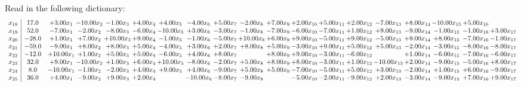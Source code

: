 \documentclass[9pt]{article}
\begin{document}
Read in the following dictionary:
\[\begin{array}{c| c c@{\hskip 2pt} c@{\hskip 2pt} c@{\hskip 2pt} c@{\hskip 2pt} c@{\hskip 2pt} c@{\hskip 2pt} c@{\hskip 2pt} c@{\hskip 2pt} c@{\hskip 2pt} c@{\hskip 2pt} c@{\hskip 2pt} c@{\hskip 2pt} c@{\hskip 2pt} c@{\hskip 2pt} c@{\hskip 2pt} c@{\hskip 2pt} c@{\hskip 2pt} }
 x_{18}   &  17.0 & +  3.00 x_{1} & -10.00 x_{2} & -1.00 x_{3} & +  4.00 x_{4} & +  4.00 x_{5} & -4.00 x_{6} & +  5.00 x_{7} & -2.00 x_{8} & +  7.00 x_{9} & +  2.00 x_{10} & +  5.00 x_{11} & +  2.00 x_{12} & -7.00 x_{13} & +  8.00 x_{14} & -10.00 x_{15} & +  5.00 x_{16} &   \\
 x_{19}   &  52.0 & -7.00 x_{1} & -2.00 x_{2} & -8.00 x_{3} & -6.00 x_{4} & -10.00 x_{5} & +  3.00 x_{6} & -3.00 x_{7} & -1.00 x_{8} & -7.00 x_{9} & -6.00 x_{10} & -7.00 x_{11} & +  1.00 x_{12} & +  9.00 x_{13} & -9.00 x_{14} & -1.00 x_{15} & -1.00 x_{16} & +  3.00 x_{17}\\
 x_{20}   &  -28.0 & +  1.00 x_{1} & +  7.00 x_{2} & + 10.00 x_{3} & +  9.00 x_{4} & -1.00 x_{5} & -1.00 x_{6} & -5.00 x_{7} & + 10.00 x_{8} & +  6.00 x_{9} & +  9.00 x_{10} & -5.00 x_{11} & +  9.00 x_{12} & -5.00 x_{13} & +  9.00 x_{14} & +  8.00 x_{15} & -7.00 x_{16} & -1.00 x_{17}\\
 x_{21}   &  -59.0 & -9.00 x_{1} & +  8.00 x_{2} & +  8.00 x_{3} & +  5.00 x_{4} & -4.00 x_{5} & +  3.00 x_{6} & +  2.00 x_{7} & +  8.00 x_{8} & +  5.00 x_{9} & -3.00 x_{10} & +  9.00 x_{11} & +  5.00 x_{12} & +  5.00 x_{13} & -2.00 x_{14} & -3.00 x_{15} & -8.00 x_{16} & -8.00 x_{17}\\
 x_{22}   &  -12.0 & + 10.00 x_{1} & +  1.00 x_{2} & +  5.00 x_{3} & +  5.00 x_{4} & -6.00 x_{5} & +  4.00 x_{6} & +  8.00 x_{7} &   & +  8.00 x_{9} & +  9.00 x_{10} & -3.00 x_{11} & -6.00 x_{12} &   & +  1.00 x_{14} & -6.00 x_{15} & -7.00 x_{16} & -6.00 x_{17}\\
 x_{23}   &  32.0 & +  9.00 x_{1} & -10.00 x_{2} & +  1.00 x_{3} & +  6.00 x_{4} & + 10.00 x_{5} & -8.00 x_{6} & -2.00 x_{7} & +  5.00 x_{8} & +  8.00 x_{9} & +  8.00 x_{10} & -3.00 x_{11} & +  1.00 x_{12} & -10.00 x_{13} & +  2.00 x_{14} & -9.00 x_{15} & -5.00 x_{16} & +  8.00 x_{17}\\
 x_{24}   &  8.0 & -10.00 x_{1} & -1.00 x_{2} & -2.00 x_{3} & +  4.00 x_{4} & +  9.00 x_{5} & +  4.00 x_{6} & -9.00 x_{7} & +  5.00 x_{8} & +  5.00 x_{9} & -7.00 x_{10} & -5.00 x_{11} & +  5.00 x_{12} & +  3.00 x_{13} & -2.00 x_{14} & +  1.00 x_{15} & +  6.00 x_{16} & -9.00 x_{17}\\
 x_{25}   &  36.0 & +  4.00 x_{1} & -9.00 x_{2} & +  9.00 x_{3} & +  2.00 x_{4} &   & -10.00 x_{6} & -8.00 x_{7} & -9.00 x_{8} &   & -5.00 x_{10} & -2.00 x_{11} & -9.00 x_{12} & +  2.00 x_{13} & -3.00 x_{14} & -9.00 x_{15} & +  7.00 x_{16} & +  9.00 x_{17}\\

\end{array}\]
\end{document}
